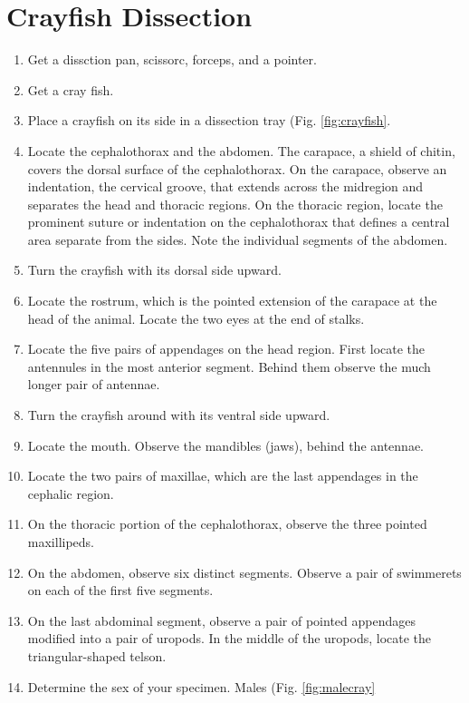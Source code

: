 \documentclass[]{book}
\providecommand{\tightlist}{%
  \setlength{\itemsep}{0pt}\setlength{\parskip}{0pt}}
\theoremstyle{definition}
\theoremstyle{definition}
\theoremstyle{definition}
\theoremstyle{remark}
\begin{document}
\section{Crayfish Dissection}\label{crayfish-dissection}

\begin{enumerate}
\def\labelenumi{\arabic{enumi}.}
\tightlist
\item
  Get a dissction pan, scissorc, forceps, and a pointer.
\item
  Get a cray fish.
\item
  Place a crayfish on its side in a dissection tray (Fig.
  \ref{fig:crayfish}.
\item
  Locate the cephalothorax and the abdomen. The carapace, a shield of
  chitin, covers the dorsal surface of the cephalothorax. On the
  carapace, observe an indentation, the cervical groove, that extends
  across the midregion and separates the head and thoracic regions. On
  the thoracic region, locate the prominent suture or indentation on the
  cephalothorax that defines a central area separate from the sides.
  Note the individual segments of the abdomen.
\item
  Turn the crayfish with its dorsal side upward.
\item
  Locate the rostrum, which is the pointed extension of the carapace at
  the head of the animal. Locate the two eyes at the end of stalks.
\item
  Locate the five pairs of appendages on the head region. First locate
  the antennules in the most anterior segment. Behind them observe the
  much longer pair of antennae.
\item
  Turn the crayfish around with its ventral side upward.
\item
  Locate the mouth. Observe the mandibles (jaws), behind the antennae.
\item
  Locate the two pairs of maxillae, which are the last appendages in the
  cephalic region.
\item
  On the thoracic portion of the cephalothorax, observe the three
  pointed maxillipeds.
\item
  On the abdomen, observe six distinct segments. Observe a pair of
  swimmerets on each of the first five segments.
\item
  On the last abdominal segment, observe a pair of pointed appendages
  modified into a pair of uropods. In the middle of the uropods, locate
  the triangular-shaped telson.
\item
  Determine the sex of your specimen. Males (Fig. \ref{fig:malecray}

\end{enumerate}
\end{document}
